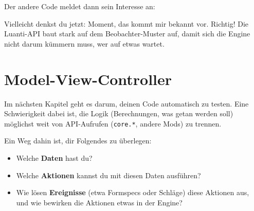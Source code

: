 Der andere Code meldet dann sein Interesse an:

\begin{Shaded}
\begin{Highlighting}[]
\OperatorTok{(}\OperatorTok{(}\OperatorTok{,} \OperatorTok{)}
         \OperatorTok{==} 
         
         \OperatorTok{:}\OperatorTok{()}
        \OperatorTok{(}\OperatorTok{,} \OperatorTok{)}
\OperatorTok{)}
\end{Highlighting}
\end{Shaded}

Vielleicht denkst du jetzt: Moment, das kommt mir bekannt vor. Richtig!
Die Luanti-API baut stark auf dem Beobachter-Muster auf, damit sich die
Engine nicht darum kümmern muss, wer auf etwas wartet.

\section{Model-View-Controller}\label{model-view-controller}

Im nächsten Kapitel geht es darum, deinen Code automatisch zu testen.
Eine Schwierigkeit dabei ist, die Logik (Berechnungen, was getan werden
soll) möglichst weit von API-Aufrufen (\texttt{core.\allowbreak{}*},
andere Mods) zu trennen.

Ein Weg dahin ist, dir Folgendes zu überlegen:

\begin{itemize}
\tightlist
\item
  Welche \textbf{Daten} hast du?
\item
  Welche \textbf{Aktionen} kannst du mit diesen Daten ausführen?
\item
  Wie lösen \textbf{Ereignisse} (etwa Formspecs
  oder Schläge) diese Aktionen aus, und wie bewirken die Aktionen etwas
  in der Engine?
\end{itemize}

